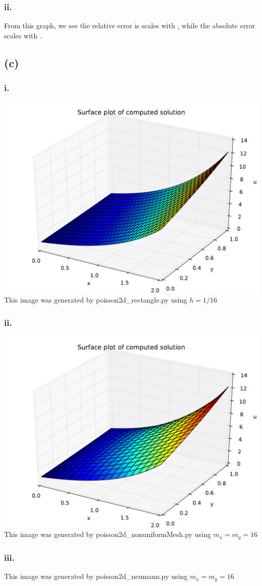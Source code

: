 \documentclass{article}
\begin{document}
\subsubsection*{ii.}
From this graph, we see the relative error is scales with , while the absolute error scales with .
\subsection*{(c)}
\subsubsection*{i.}
\includegraphics[width=\linewidth]{ci.pdf}
This image was generated by poisson2d\_rectangle.py using $h=1/16$
\subsubsection*{ii.}
\includegraphics[width=\linewidth]{cii.pdf}
This image was generated by poisson2d\_nonuniformMesh.py using $m_x=m_y=16$
\subsubsection*{iii.}
This image was generated by poisson2d\_neumann.py using $m_x=m_y=16$
\end{document}
